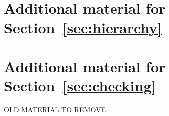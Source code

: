 \documentclass[acmsmall,review,anonymous,screen]{acmart}\settopmatter{printfolios=true,printccs=false,printacmref=true}
\begin{document}
\section{Additional material for Section~\ref{sec:hierarchy}}
\label{apx:hierarchy}


\section{Additional material for Section~\ref{sec:checking}}
\label{apx:checking}



\fi

\ifcomments
\newpage
OLD MATERIAL TO REMOVE


% 

\fi
\end{document}
